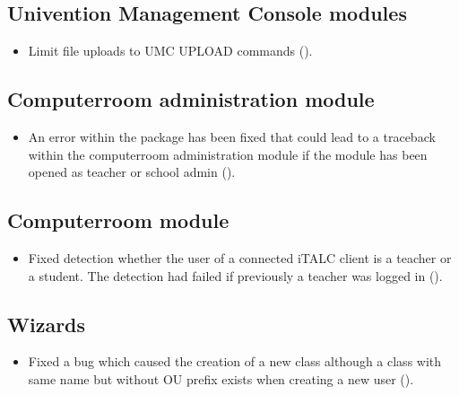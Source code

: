 
\subsection{Univention Management Console modules}
\begin{itemize}
\item Limit file uploads to UMC UPLOAD commands ().
\end{itemize}


\subsection{Computerroom administration module}
\begin{itemize}
\item An error within the package  has been fixed that could lead to a traceback
  within the computerroom administration module if the module has been opened as teacher or school admin ().
\end{itemize}

\subsection{Computerroom module}
\begin{itemize}
\item Fixed detection whether the user of a connected iTALC client is a teacher or a student. The detection had failed if previously a teacher was logged in ().
\end{itemize}

\subsection{Wizards}
\begin{itemize}
\item Fixed a bug which caused the creation of a new class although a class with same name but without OU prefix exists when creating a new user ().
\end{itemize}



